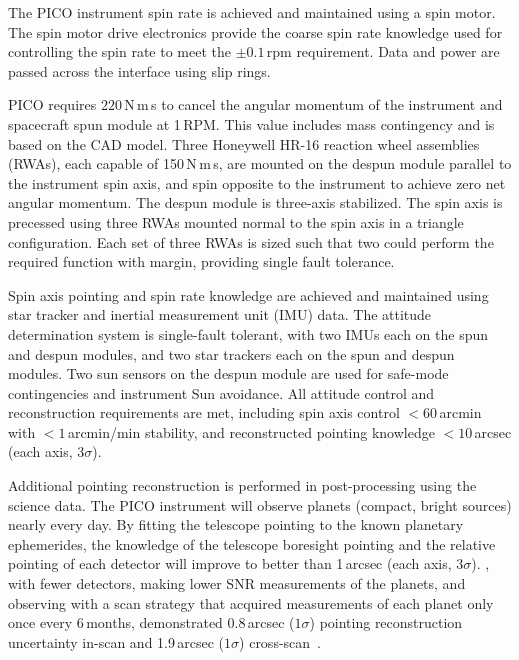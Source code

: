 The PICO instrument spin rate is achieved and maintained using a spin motor. The spin motor drive electronics provide the coarse spin rate knowledge used for controlling the spin rate to meet the $\pm0.1$\,rpm requirement. Data and power are passed across the interface using slip rings.

PICO requires $220$\,N\,m\,s to cancel the angular momentum of the instrument and spacecraft spun module at 1\,RPM. This value includes mass contingency and is based on the CAD model. Three Honeywell HR-16 reaction wheel assemblies (RWAs), each capable of 150\,N\,m\,s, are mounted on the despun module parallel to the instrument spin axis, and spin opposite to the instrument to achieve zero net angular momentum. The despun module is three-axis stabilized. The spin axis is precessed using three RWAs mounted normal to the spin axis in a triangle configuration. Each set of three RWAs is sized such that two could perform the required function with margin, providing single fault tolerance.

Spin axis pointing and spin rate knowledge are achieved and maintained using star tracker and inertial measurement unit (IMU) data. The attitude determination system is single-fault tolerant, with two IMUs each on the spun and despun modules, and two star trackers each on the spun and despun modules. Two sun sensors on the despun module are used for safe-mode contingencies and instrument Sun avoidance. All attitude control and reconstruction requirements are met, including spin axis control $< 60$\,arcmin with $< 1$\,arcmin/min stability, and reconstructed pointing knowledge $< 10$\,arcsec (each axis, $3\sigma$).

Additional pointing reconstruction is performed in post-processing using the science data.  The PICO instrument will observe planets (compact, bright sources) nearly every day.  By fitting the telescope pointing to the known planetary ephemerides, the knowledge of the telescope boresight pointing and the relative pointing of each detector will improve to better than 1\,arcsec (each axis, $3\sigma$). \planck , with fewer detectors, making lower \ac{SNR} measurements of the planets, and observing with a scan strategy that acquired measurements of each planet only once every 6\,months, demonstrated 0.8\,arcsec ($1\sigma$) pointing reconstruction uncertainty in-scan and 1.9\,arcsec ($1\sigma$) cross-scan~\citep{2016A&A...594A...1P}.

